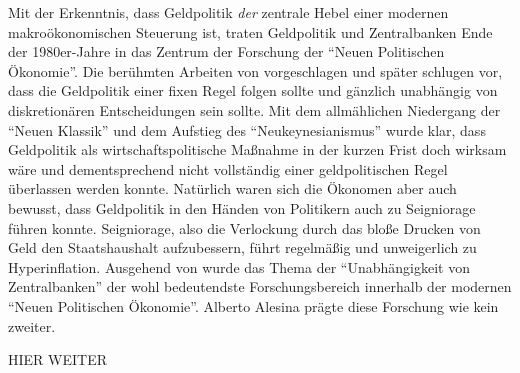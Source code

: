 Mit der Erkenntnis, dass Geldpolitik \textit{der} zentrale Hebel einer modernen makroökonomischen Steuerung ist, traten Geldpolitik und Zentralbanken Ende der 1980er-Jahre in das Zentrum der Forschung der "`Neuen Politischen Ökonomie"'. Die berühmten Arbeiten von \textcite{Friedman1968} vorgeschlagen und später \textcite{Kydland1977} schlugen vor, dass die Geldpolitik einer fixen Regel folgen sollte und gänzlich unabhängig von diskretionären Entscheidungen sein sollte. Mit dem allmählichen Niedergang der "`Neuen Klassik"' und dem Aufstieg des "`Neukeynesianismus"' wurde klar, dass Geldpolitik als wirtschaftspolitische Maßnahme in der kurzen Frist doch wirksam wäre und dementsprechend nicht vollständig einer geldpolitischen Regel überlassen werden konnte. Natürlich waren sich die Ökonomen aber auch bewusst, dass Geldpolitik in den Händen von Politikern auch zu Seigniorage führen konnte. Seigniorage, also die Verlockung durch das bloße Drucken von Geld den Staatshaushalt aufzubessern, führt regelmäßig und unweigerlich zu Hyperinflation. Ausgehend von \textcite{Alesina1988c} wurde das Thema der "`Unabhängigkeit von Zentralbanken"' der wohl bedeutendste Forschungsbereich innerhalb der modernen "`Neuen Politischen Ökonomie"'. Alberto Alesina prägte diese Forschung wie kein zweiter.

HIER WEITER \textcite[S. 549]{Snowdon2005}













